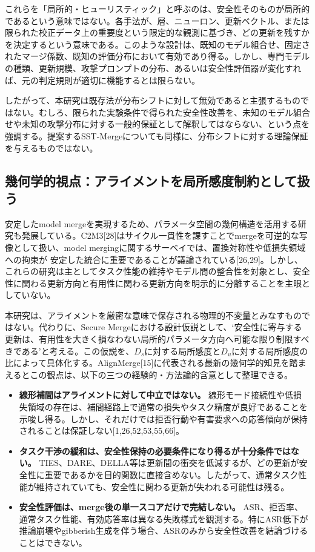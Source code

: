 これらを「局所的・ヒューリスティック」と呼ぶのは、安全性そのものが局所的であるという意味ではない。各手法が、層、ニューロン、更新ベクトル、または限られた校正データ上の重要度という限定的な観測に基づき、どの更新を残すかを決定するという意味である。このような設計は、既知のモデル組合せ、固定されたマージ係数、既知の評価分布において有効であり得る。しかし、専門モデルの種類、更新規模、攻撃プロンプトの分布、あるいは安全性評価器が変化すれば、元の判定規則が適切に機能するとは限らない。

したがって、本研究は既存法が分布シフトに対して無効であると主張するものではない。むしろ、限られた実験条件で得られた安全性改善を、未知のモデル組合せや未知の攻撃分布に対する一般的保証として解釈してはならない、という点を強調する。提案するSST-Mergeについても同様に、分布シフトに対する理論保証を与えるものではない。

\subsection{幾何学的視点：アライメントを局所感度制約として扱う}
\label{app:geometry}

安定したmodel mergeを実現するため、パラメータ空間の幾何構造を活用する研究も発展している。C2M3[28]はサイクル一貫性を課すことでmergeを可逆的な写像として扱い、model mergingに関するサーベイでは、置換対称性や低損失領域への拘束が
安定した統合に重要であることが議論されている[26,29]。しかし、これらの研究は主としてタスク性能の維持やモデル間の整合性を対象とし、安全性に関わる更新方向と有用性に関わる更新方向を明示的に分離することを主眼としていない。

本研究は、アライメントを厳密な意味で保存される物理的不変量とみなすものではない。代わりに、Secure Mergeにおける設計仮説として、`安全性に寄与する更新は、有用性を大きく損なわない局所的パラメータ方向へ可能な限り制限すべきである'と考える。この仮説を、\(D_s\)に対する局所感度と\(D_u\)に対する局所感度の比によって具体化する。AlignMerge[15]に代表される最新の幾何学的知見を踏まえるとこの観点は、以下の三つの経験的・方法論的含意として整理できる。
\begin{itemize}
\item \textbf{線形補間はアライメントに対して中立ではない。}
  線形モード接続性や低損失領域の存在は、補間経路上で通常の損失やタスク精度が良好であることを示唆し得る。しかし、それだけでは拒否行動や有害要求への応答傾向が保持されることは保証しない[1,26,52,53,55,66]。
\item \textbf{タスク干渉の緩和は、安全性保持の必要条件になり得るが十分条件ではない。}
  TIES、DARE、DELLA等は更新間の衝突を低減するが、どの更新が安全性に重要であるかを目的関数に直接含めない。したがって、通常タスク性能が維持されていても、安全性に関わる更新が失われる可能性は残る。
\item \textbf{安全性評価は、merge後の単一スコアだけで完結しない。}
  ASR、拒否率、通常タスク性能、有効応答率は異なる失敗様式を観測する。特にASR低下が推論崩壊やgibberish生成を伴う場合、ASRのみから安全性改善を結論づけることはできない。
\end{itemize}

